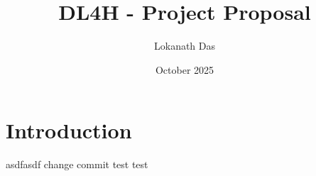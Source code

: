 \documentclass{article}
\title{DL4H - Project Proposal}
\author{Lokanath Das}
\date{October 2025}
\begin{document}
\maketitle

\section{Introduction}
asdfasdf
change commit test test
\end{document}
